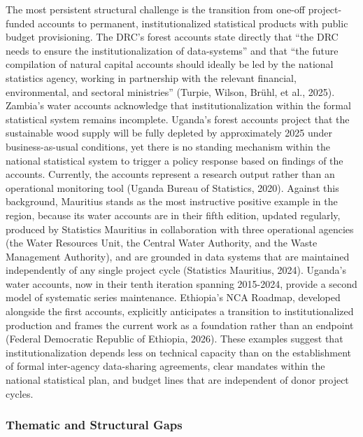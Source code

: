 \documentclass[
  letterpaper,
  DIV=11,
  numbers=noendperiod]{scrartcl}
\begin{document}
The most persistent structural challenge is the transition from one-off
project-funded accounts to permanent, institutionalized statistical
products with public budget provisioning. The DRC's forest accounts
state directly that ``the DRC needs to ensure the institutionalization
of data-systems'' and that ``the future compilation of natural capital
accounts should ideally be led by the national statistics agency,
working in partnership with the relevant financial, environmental, and
sectoral ministries'' (Turpie, Wilson, Brühl, et al., 2025). Zambia's
water accounts acknowledge that institutionalization within the formal
statistical system remains incomplete. Uganda's forest accounts project
that the sustainable wood supply will be fully depleted by approximately
2025 under business-as-usual conditions, yet there is no standing
mechanism within the national statistical system to trigger a policy
response based on findings of the accounts. Currently, the accounts
represent a research output rather than an operational monitoring tool
(Uganda Bureau of Statistics, 2020). Against this background, Mauritius
stands as the most instructive positive example in the region, because
its water accounts are in their fifth edition, updated regularly,
produced by Statistics Mauritius in collaboration with three operational
agencies (the Water Resources Unit, the Central Water Authority, and the
Waste Management Authority), and are grounded in data systems that are
maintained independently of any single project cycle (Statistics
Mauritius, 2024). Uganda's water accounts, now in their tenth iteration
spanning 2015-2024, provide a second model of systematic series
maintenance. Ethiopia's NCA Roadmap, developed alongside the first
accounts, explicitly anticipates a transition to institutionalized
production and frames the current work as a foundation rather than an
endpoint (Federal Democratic Republic of Ethiopia, 2026). These examples
suggest that institutionalization depends less on technical capacity
than on the establishment of formal inter-agency data-sharing
agreements, clear mandates within the national statistical plan, and
budget lines that are independent of donor project cycles.

\subsubsection{Thematic and Structural
Gaps}\label{thematic-and-structural-gaps}
\end{document}
